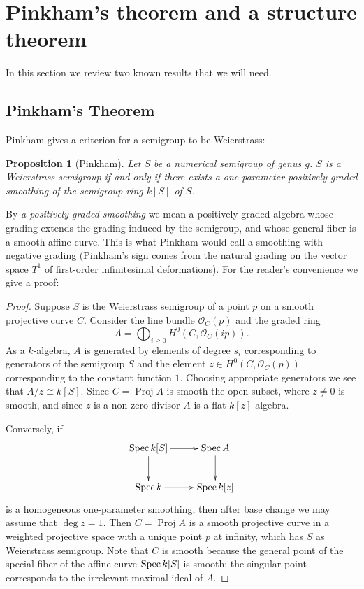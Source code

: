 \documentclass[twoside,12pt, leqno]{amsart}
\newtheorem{proposition}[theorem]{Proposition}
\theoremstyle{definition}
\def\sO{{\mathcal O}}
\DeclareMathOperator{\Proj}{{Proj}}
\DeclareMathOperator{\Spec}{{Spec}}
\def\Spec{{{\rm Spec}\,}}
\begin{document}
\section{Pinkham's theorem and a structure theorem} \label{Pinkham section}

In this section we review two known results that we will need.

\subsection{Pinkham's Theorem}
 
 Pinkham  \cite[Theorem 13.9]{MR376672} gives a criterion for a semigroup to be Weierstrass:


\begin{proposition}[Pinkham] \label{full Pinkham}
Let $S$ be a numerical semigroup of genus $g$. $S$ is a Weierstrass semigroup if and only if there exists a one-parameter positively graded  smoothing of the semigroup  ring $k[S]$ of $S$.
\end{proposition}

By \emph{ a positively graded smoothing} we mean a positively graded algebra whose grading extends the grading induced by the
semigroup, and whose general fiber is a smooth affine curve. This is what Pinkham would call a smoothing with negative grading (Pinkham's sign comes from the natural grading on the vector space $T^1$ of first-order infinitesimal deformations). For the reader's convenience we give a proof:

\begin{proof}
Suppose $S$ is the Weierstrass semigroup of a point $p$ on a smooth projective curve $C$.
Consider the line bundle $\sO_{C}(p)$ and the graded ring
$$
A= \bigoplus_{i\ge 0} H^0(C,\sO_{C}(ip)).
$$
As a $k$-algebra, $A$ is generated by elements of degree $s_{i}$ corresponding to generators of the semigroup $S$ and the element 
$z \in H^0(C,\sO_{C}(p))$ corresponding to the constant function $1$.
Choosing appropriate generators we see that $A/z \cong k[S]$. Since $C = \Proj A$ is smooth the open subset, where $z\not=0$ is smooth, and since
$z$ is a non-zero divisor $A$ is a flat $k[z]$-algebra.

Conversely, if  
$$
\xymatrix{ \Spec k[S] \ar[r] \ar[d] & \Spec A \ar[d]\cr
                 \Spec k  \ar[r] & \Spec k[z] \cr }
 $$
 is a homogeneous one-parameter smoothing, then after base change we may assume that $\deg z=1$.
 Then $C=\Proj A$ is a smooth projective curve in a weighted projective space with a unique point $p$ at infinity, which has $S$ as Weierstrass semigroup. Note that $C$ is smooth because the general point of the special fiber of the affine curve $\Spec k[S]$  
 is smooth; the singular point corresponds to the irrelevant maximal ideal of $A$.
 \end{proof}
                 
\end{document}
